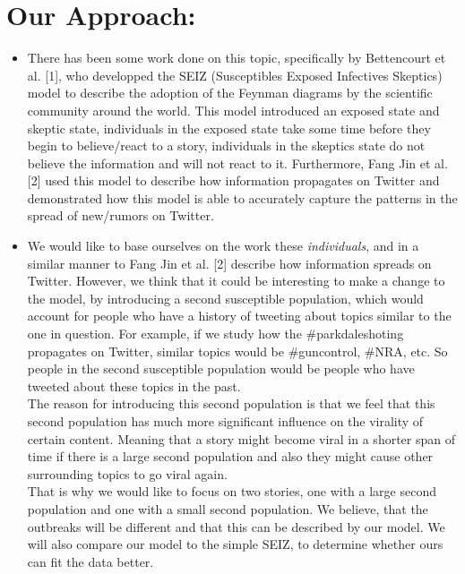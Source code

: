 \documentclass{article}
\begin{document}
\section{Our Approach:}
\begin{itemize}
\item There has been some work done on this topic, specifically by Bettencourt et al. [1], who developped the SEIZ (Susceptibles Exposed Infectives Skeptics) model to describe the adoption of the Feynman diagrams by the scientific community around the world. This model introduced an exposed state and skeptic state, individuals in the exposed state take some time before they begin to believe/react to a story, individuals in the skeptics state do not believe the information and will not react to it. Furthermore, Fang Jin et al. [2] used this model to describe how information propagates on Twitter and demonstrated how this model is able to accurately capture the patterns in the spread of new/rumors on Twitter. 
\item  We would like to base ourselves on the work these\textit{ individuals}, and in a similar manner to Fang Jin et al. [2] describe how information spreads on Twitter. However, we think that it could be interesting to make a change to the model, by introducing a second susceptible population, which would account for people who have a history of tweeting about topics similar to the one in question. For example, if we study how the \#parkdaleshoting propagates on Twitter, similar topics would be \#guncontrol, \#NRA, etc. So people in the second susceptible population would be people who have tweeted about these topics in the past. \\
The reason for introducing this second population is that we feel that this second population has much more significant influence on the virality of certain content. Meaning that a story might become viral in a shorter span of time if there is a large second population and also they might cause other surrounding topics to go viral again. 
\\That is why we would like to focus on two stories, one with a large second population and one with a small second population. We believe, that the outbreaks will be different and that this can be described by our model. We will also compare our model to the simple SEIZ, to determine whether ours can fit the data better.


\end{itemize}
\end{document}
